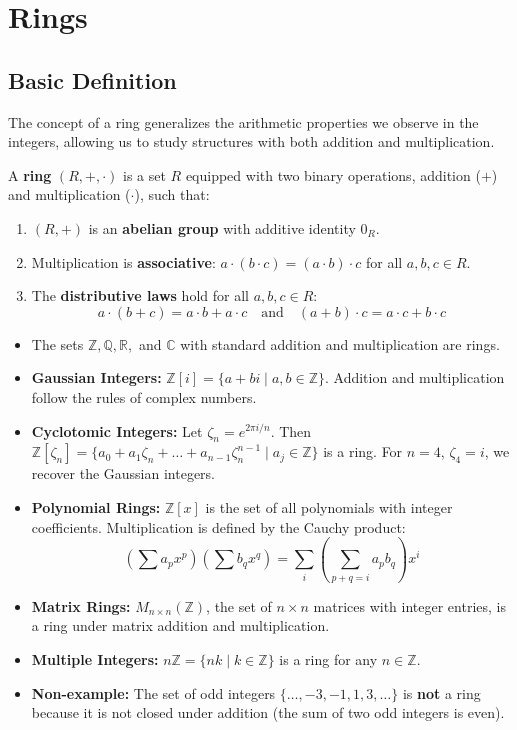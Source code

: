 \chapter{Rings}
\section{Basic Definition}


The concept of a ring generalizes the arithmetic properties we observe in the integers, allowing us to study structures with both addition and multiplication.

\begin{definition}[Ring]
A \textbf{ring} $(R, +, \cdot)$ is a set $R$ equipped with two binary operations, addition ($+$) and multiplication ($\cdot$), such that:
\begin{enumerate}
    \item $(R, +)$ is an \textbf{abelian group} with additive identity $0_R$.
    \item Multiplication is \textbf{associative}: $a \cdot (b \cdot c) = (a \cdot b) \cdot c$ for all $a, b, c \in R$.
    \item The \textbf{distributive laws} hold for all $a, b, c \in R$:
    \[ a \cdot (b + c) = a \cdot b + a \cdot c \quad \text{and} \quad (a + b) \cdot c = a \cdot c + b \cdot c \]
\end{enumerate}
\end{definition}

\begin{example}
\begin{itemize}
    \item The sets $\mathbb{Z}, \mathbb{Q}, \mathbb{R},$ and $\mathbb{C}$ with standard addition and multiplication are rings.
    \item \textbf{Gaussian Integers:} $\mathbb{Z}[i] = \{ a + bi \mid a, b \in \mathbb{Z} \}$. Addition and multiplication follow the rules of complex numbers.
    \item \textbf{Cyclotomic Integers:} Let $\zeta_n = e^{2\pi i/n}$. Then $\mathbb{Z}[\zeta_n] = \{ a_0 + a_1\zeta_n + \dots + a_{n-1}\zeta_n^{n-1} \mid a_j \in \mathbb{Z} \}$ is a ring. For $n=4$, $\zeta_4 = i$, we recover the Gaussian integers.
    \item \textbf{Polynomial Rings:} $\mathbb{Z}[x]$ is the set of all polynomials with integer coefficients. Multiplication is defined by the Cauchy product:
    \[ \left( \sum a_p x^p \right) \left( \sum b_q x^q \right) = \sum_{i} \left( \sum_{p+q=i} a_p b_q \right) x^i \]
    \item \textbf{Matrix Rings:} $M_{n \times n}(\mathbb{Z})$, the set of $n \times n$ matrices with integer entries, is a ring under matrix addition and multiplication.
    \item \textbf{Multiple Integers:} $n\mathbb{Z} = \{ nk \mid k \in \mathbb{Z} \}$ is a ring for any $n \in \mathbb{Z}$.
    \item \textbf{Non-example:} The set of odd integers $\{\dots, -3, -1, 1, 3, \dots\}$ is \textbf{not} a ring because it is not closed under addition (the sum of two odd integers is even).
\end{itemize}
\end{example}

